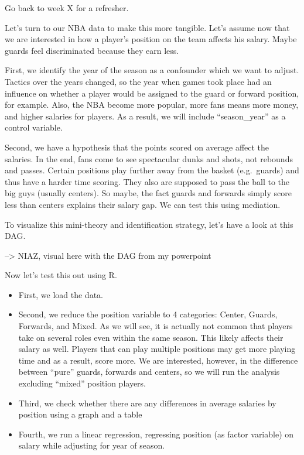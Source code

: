 \documentclass[
]{book}
\providecommand{\tightlist}{%
  \setlength{\itemsep}{0pt}\setlength{\parskip}{0pt}}
\begin{document}
Go back to week X for a refresher.

Let's turn to our NBA data to make this more tangible. Let's assume now that we are interested in how a player's position on the team affects his salary. Maybe guards feel
discriminated because they earn less.

First, we identify the year of the season as a confounder which we want to adjust.
Tactics over the years changed, so the year when games took place had an influence on
whether a player would be assigned to the guard or forward position, for example.
Also, the NBA become more popular, more fans means more money, and higher salaries
for players. As a result, we will include ``season\_year'' as a control variable.

Second, we have a hypothesis that the points scored on average affect the salaries.
In the end, fans come to see spectacular dunks and shots, not rebounds and passes.
Certain positions play further away from the basket (e.g.~guards) and thus have a harder time scoring. They also are supposed to pass the ball to the big guys (usually centers).
So maybe, the fact guards and forwards simply score less than centers explains their salary gap. We can test this using mediation.

To visualize this mini-theory and identification strategy, let's have a look at this DAG.

--\textgreater{} NIAZ, visual here with the DAG from my powerpoint

Now let's test this out using R.

\begin{itemize}
\tightlist
\item
  First, we load the data.
\item
  Second, we reduce the position variable to 4 categories: Center, Guards, Forwards, and Mixed. As we will see, it is actually not common that players take on several roles even within the same season. This likely affects their salary as well. Players that can play multiple positions may get more playing time and as a result, score more. We are interested, however, in the difference between ``pure'' guards, forwards and centers, so we will run the analysis excluding ``mixed'' position players.
\item
  Third, we check whether there are any differences in average salaries by position using a graph and a table
\item
  Fourth, we run a linear regression, regressing position (as factor variable) on salary while adjusting for year of season.
\end{itemize}
\end{document}
